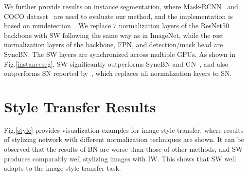 \documentclass[10pt,twocolumn,letterpaper]{article}
\begin{document}
We further provide results on instance segmentation, where Mask-RCNN~\cite{he2017mask} and COCO dataset~\cite{lin2014microsoft} are used to evaluate our method, and the implementation is based on mmdetection~\cite{chen2019mmdetection}.
We replace 7 normalization layers of the ResNet50 backbone with SW following the same way as in ImageNet, while the rest normalization layers of the backbone, FPN, and detection/mask head are SyncBN.
The SW layers are synchronized across multiple GPUs.
As shown in Fig.\ref{instanceseg}, SW significantly outperforms SyncBN and GN~\cite{wu2018group}, and also outperforms SN reported by~\cite{luo2018differentiable}, which replaces all normalization layers to SN.


\section{Style Transfer Results}

Fig.\ref{style} provides visualization examples for image style transfer, where results of stylizing network with different normalization techniques are shown.
It can be observed that the results of BN are worse than those of other methods, and SW produces comparably well stylizing images with IW.
This shows that SW well adapts to the image style transfer task. 	
\end{document}
